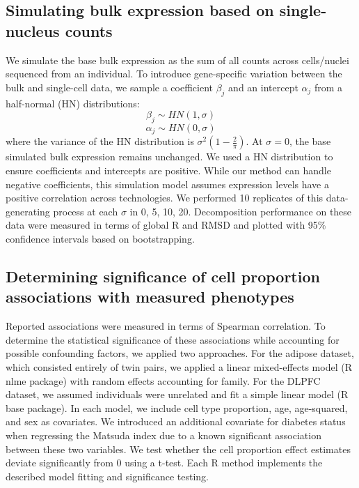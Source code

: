 \subsection{Simulating bulk expression based on single-nucleus counts}

We simulate the base bulk expression as the sum of all counts across cells/nuclei sequenced from an individual. To introduce gene-specific variation between the bulk and single-cell data, we sample a coefficient $\beta_j$ and an intercept $\alpha_j$ from a half-normal (HN) distributions:
\begin{equation}
    \beta_j \sim HN(1,\sigma)
\end{equation}
\begin{equation}
    \alpha_j \sim HN(0,\sigma)
\end{equation}
where the variance of the HN distribution is $\sigma^2(1-\frac{2}{\pi})$. At $\sigma = 0$, the base simulated bulk expression remains unchanged. We used a HN distribution to ensure coefficients and intercepts are positive. While our method can handle negative coefficients, this simulation model assumes expression levels have a positive correlation across technologies. We performed 10 replicates of this data-generating process at each $\sigma$ in 0, 5, 10, 20. Decomposition performance on these data were measured in terms of global R and RMSD and plotted with 95\% confidence intervals based on bootstrapping. 

\subsection{Determining significance of cell proportion associations with measured phenotypes}

Reported associations were measured in terms of Spearman correlation. To determine the statistical significance of these associations while accounting for possible confounding factors, we applied two approaches. For the adipose dataset, which consisted entirely of twin pairs, we applied a linear mixed-effects model (R nlme package) with random effects accounting for family. For the DLPFC dataset, we assumed individuals were unrelated and fit a simple linear model (R base package). In each model, we include cell type proportion, age, age-squared, and sex as covariates. We introduced an additional covariate for diabetes status when regressing the Matsuda index due to a known significant association between these two variables. We test whether the cell proportion effect estimates deviate significantly from 0 using a t-test. Each R method implements the described model fitting and significance testing.

